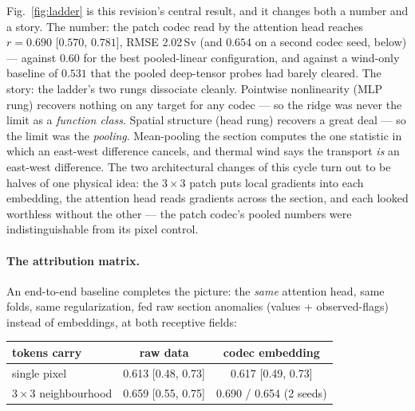 \documentclass[10pt]{article}
\begin{document}
Fig.~\ref{fig:ladder} is this revision's central result, and it changes
both a number and a story. The number: the patch codec read by the
attention head reaches $r=0.690$ [$0.570$, $0.781$], RMSE 2.02\,Sv
(and $0.654$ on a second codec seed, below) ---
against $0.60$ for the best pooled-linear configuration, and against a
wind-only baseline of $0.531$ that the pooled deep-tensor probes had
barely cleared. The story: the ladder's two rungs dissociate cleanly.
Pointwise nonlinearity (MLP rung) recovers nothing on any target for any
codec --- so the ridge was never the limit as a \emph{function class}.
Spatial structure (head rung) recovers a great deal --- so the limit was
the \emph{pooling}. Mean-pooling the section computes the one statistic
in which an east-west difference cancels, and thermal wind says the
transport \emph{is} an east-west difference. The two architectural
changes of this cycle turn out to be halves of one physical idea: the
$3\times3$ patch puts local gradients into each embedding, the attention
head reads gradients across the section, and each looked worthless
without the other --- the patch codec's pooled numbers were
indistinguishable from its pixel control.

\paragraph{The attribution matrix.} An end-to-end baseline completes
the picture: the \emph{same} attention head, same folds, same
regularization, fed raw section anomalies (values + observed-flags)
instead of embeddings, at both receptive fields:

\begin{center}\small
\begin{tabular}{lcc}
\toprule
tokens carry & raw data & codec embedding \\
\midrule
single pixel & 0.613 [0.48, 0.73] & 0.617 [0.49, 0.73] \\
$3\times3$ neighbourhood & 0.659 [0.55, 0.75] & 0.690 / 0.654 (2 seeds) \\
\bottomrule
\end{tabular}
\end{center}
\end{document}
